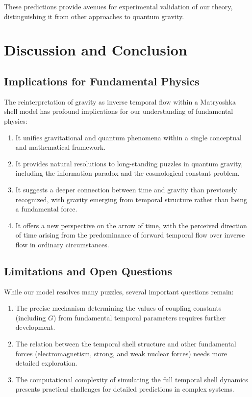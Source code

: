 \documentclass[12pt,a4paper]{article}
\begin{document}
These predictions provide avenues for experimental validation of our theory, distinguishing it from other approaches to quantum gravity.

\section{Discussion and Conclusion}

\subsection{Implications for Fundamental Physics}

The reinterpretation of gravity as inverse temporal flow within a Matryoshka shell model has profound implications for our understanding of fundamental physics:

\begin{enumerate}
    \item It unifies gravitational and quantum phenomena within a single conceptual and mathematical framework.
    
    \item It provides natural resolutions to long-standing puzzles in quantum gravity, including the information paradox and the cosmological constant problem.
    
    \item It suggests a deeper connection between time and gravity than previously recognized, with gravity emerging from temporal structure rather than being a fundamental force.
    
    \item It offers a new perspective on the arrow of time, with the perceived direction of time arising from the predominance of forward temporal flow over inverse flow in ordinary circumstances.
\end{enumerate}

\subsection{Limitations and Open Questions}

While our model resolves many puzzles, several important questions remain:

\begin{enumerate}
    \item The precise mechanism determining the values of coupling constants (including $G$) from fundamental temporal parameters requires further development.
    
    \item The relation between the temporal shell structure and other fundamental forces (electromagnetism, strong, and weak nuclear forces) needs more detailed exploration.
    
    \item The computational complexity of simulating the full temporal shell dynamics presents practical challenges for detailed predictions in complex systems.
\end{enumerate}
\end{document}
